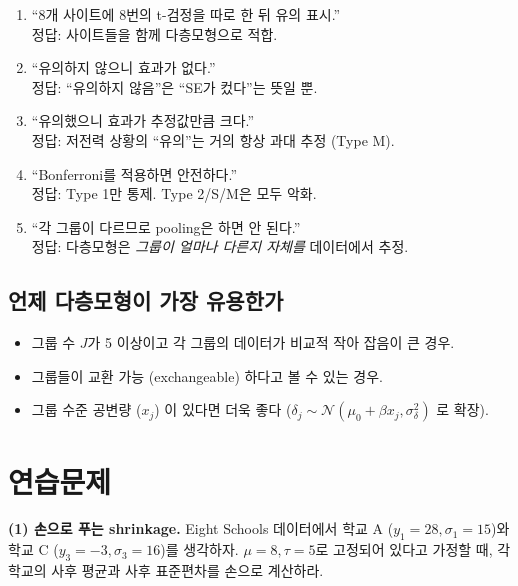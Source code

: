 \documentclass[11pt,a4paper]{article}
\newcommand{\Normal}{\mathcal{N}}
\begin{document}
\begin{warn}
\begin{enumerate}
\item ``8개 사이트에 8번의 t-검정을 따로 한 뒤 유의 표시.''\\
      정답: 사이트들을 함께 다층모형으로 적합.
\item ``유의하지 않으니 효과가 없다.''\\
      정답: ``유의하지 않음''은 ``SE가 컸다''는 뜻일 뿐.
\item ``유의했으니 효과가 추정값만큼 크다.''\\
      정답: 저전력 상황의 ``유의''는 거의 항상 과대 추정 (Type M).
\item ``Bonferroni를 적용하면 안전하다.''\\
      정답: Type 1만 통제. Type 2/S/M은 모두 악화.
\item ``각 그룹이 다르므로 pooling은 하면 안 된다.''\\
      정답: 다층모형은 \emph{그룹이 얼마나 다른지 자체를} 데이터에서 추정.
\end{enumerate}
\end{warn}

\subsection{언제 다층모형이 가장 유용한가}

\begin{itemize}
  \item 그룹 수 $J$가 5 이상이고 각 그룹의 데이터가 비교적 작아 잡음이 큰 경우.
  \item 그룹들이 교환 가능 (exchangeable) 하다고 볼 수 있는 경우.
  \item 그룹 수준 공변량 ($x_j$) 이 있다면 더욱 좋다 ($\delta_j \sim \Normal(\mu_0 + \beta x_j, \sigma_\delta^2)$ 로 확장).
\end{itemize}

\section{연습문제}

\begin{exercise}
\textbf{(1) 손으로 푸는 shrinkage.}
Eight Schools 데이터에서 학교 A ($y_1=28, \sigma_1=15$)와 학교 C ($y_3=-3, \sigma_3=16$)를 생각하자.
$\mu=8, \tau=5$로 고정되어 있다고 가정할 때, 각 학교의 사후 평균과 사후 표준편차를 손으로 계산하라.
\end{exercise}
\end{document}
